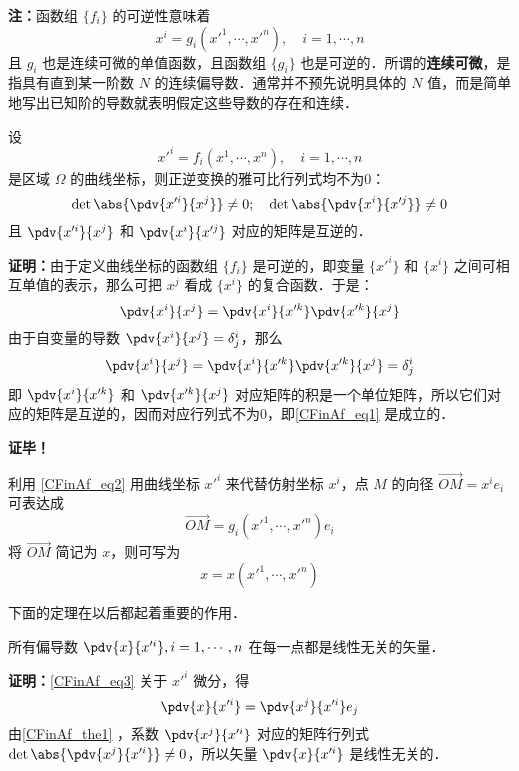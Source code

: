 \textbf{注：}函数组 $\{f_i\}$ 的可逆性意味着
\begin{equation}\label{CFinAf_eq2}
x^i=g_i(x'^1,\cdots,x'^n),\quad i=1,\cdots,n
\end{equation}
且 $g_i$ 也是连续可微的单值函数，且函数组 $\{g_i\}$ 也是可逆的．所谓的\textbf{连续可微}，是指具有直到某一阶数 $N$ 的连续偏导数．通常并不预先说明具体的 $N$ 值，而是简单地写出已知阶的导数就表明假定这些导数的存在和连续．
\begin{theorem}{}\label{CFinAf_the1}
设
\begin{equation}
x'^i=f_i(x^1,\cdots,x^n),\quad i=1,\cdots,n
\end{equation}
是区域 $\Omega$ 的曲线坐标，则正逆变换的雅可比行列式均不为0：
\begin{equation}\label{CFinAf_eq1}
\det\abs{\pdv{x'^i}{x^j}}\neq0;\quad\det\abs{\pdv{x^i}{x'^j}}\neq0
\end{equation}
且 $\pdv{x'^i}{x^j}$ 和 $\pdv{x^i}{x'^j}$ 对应的矩阵是互逆的．
\end{theorem}
\textbf{证明：}由于定义曲线坐标的函数组 $\{f_i\}$ 是可逆的，即变量 $\{x'^i\}$ 和 $\{x^i\}$ 之间可相互单值的表示，那么可把 $x^j$ 看成 $\{x^i\}$ 的复合函数．于是：
\begin{equation}
\pdv{x^i}{x^j}=\pdv{x^i}{x'^k}\pdv{x'^k}{x^j}
\end{equation}
由于自变量的导数 $\pdv{x^i}{x^j}=\delta^i_j$，那么
\begin{equation}
\pdv{x^i}{x^j}=\pdv{x^i}{x'^k}\pdv{x'^k}{x^j}=\delta^i_j
\end{equation}
即 $\pdv{x^i}{x'^k}$ 和 $\pdv{x'^k}{x^j}$ 对应矩阵的积是一个单位矩阵，所以它们对应的矩阵是互逆的，因而对应行列式不为0，即\autoref{CFinAf_eq1} 是成立的．

 
\textbf{证毕！}

利用 \autoref{CFinAf_eq2} 用曲线坐标 $x'^i$ 来代替仿射坐标 $x^i$，点 $M$ 的向径 $\overrightarrow {OM}=x^i e_i$ 可表达成
\begin{equation}\label{CFinAf_eq3}
\overrightarrow{OM}=g_i(x'^1,\cdots,x'^n)e_i
\end{equation}
将 $\overrightarrow{OM}$ 简记为 $x$，则可写为
\begin{equation}
x=x(x'^1,\cdots,x'^n)
\end{equation}

下面的定理在以后都起着重要的作用．
\begin{theorem}{}\label{CFinAf_the2}
所有偏导数 $\pdv{x}{x'^i},i=1,\cdots,n$ 在每一点都是线性无关的矢量．
\end{theorem}
\textbf{证明：}\autoref{CFinAf_eq3} 关于 $x'^i$ 微分，得
\begin{equation}
\pdv{x}{x'^i}=\pdv{x^j}{x'^i}e_j
\end{equation}
由\autoref{CFinAf_the1} ，系数 $\pdv{x^j}{x'^i}$ 对应的矩阵行列式 $\det\abs{\pdv{x^j}{x'^i}}\neq0$，所以矢量 $\pdv{x}{x'^i}$ 是线性无关的．


